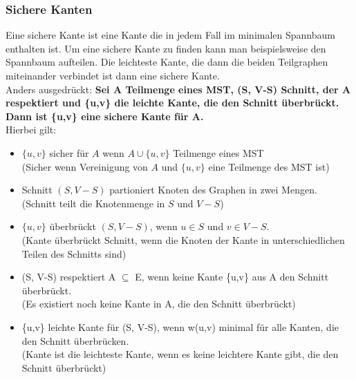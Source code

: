 \documentclass[
../AuD-Zusammenfassung.tex,
]
{subfiles}
\begin{document}
\subsubsection*{Sichere Kanten}
Eine sichere Kante ist eine Kante die in jedem Fall im minimalen Spannbaum enthalten ist. Um eine sichere Kante zu finden kann man beispielsweise den Spannbaum aufteilen. Die leichteste Kante, die dann die beiden Teilgraphen miteinander verbindet ist dann eine sichere Kante.\\
Anders ausgedrückt: \textbf{Sei A Teilmenge eines MST, (S, V-S) Schnitt, der A respektiert und \{u,v\} die leichte Kante, die den Schnitt überbrückt. Dann ist \{u,v\} eine sichere Kante für A.} \\
Hierbei gilt:
\begin{itemize}
    \item $\{u,v\}$ sicher für $A$ wenn $A \cup \{u,v\}$ Teilmenge eines MST \\
    (Sicher wenn Vereinigung von $A$ und $\{u,v\}$ eine Teilmenge des MST ist)
    \item Schnitt $(S, V-S)$ partioniert Knoten des Graphen in zwei Mengen. \\
    (Schnitt teilt die Knotenmenge in $S$ und $V - S$)
    \item $\{u,v\}$ überbrückt $(S, V-S)$, wenn $u \in S$ und $v \in V-S$. \\
    (Kante überbrückt Schnitt, wenn die Knoten der Kante in unterschiedlichen Teilen des Schnitts sind)
    \item (S, V-S) respektiert A $\subseteq$ E, wenn keine Kante \{u,v\} aus A den Schnitt überbrückt. \\
    (Es existiert noch keine Kante in A, die den Schnitt überbrückt)
    \item \{u,v\} leichte Kante für (S, V-S), wenn w(u,v) minimal für alle Kanten, die den Schnitt überbrücken. \\
    (Kante ist die leichteste Kante, wenn es keine leichtere Kante gibt, die den Schnitt überbrückt)
\end{itemize}
\newpage
\end{document}
